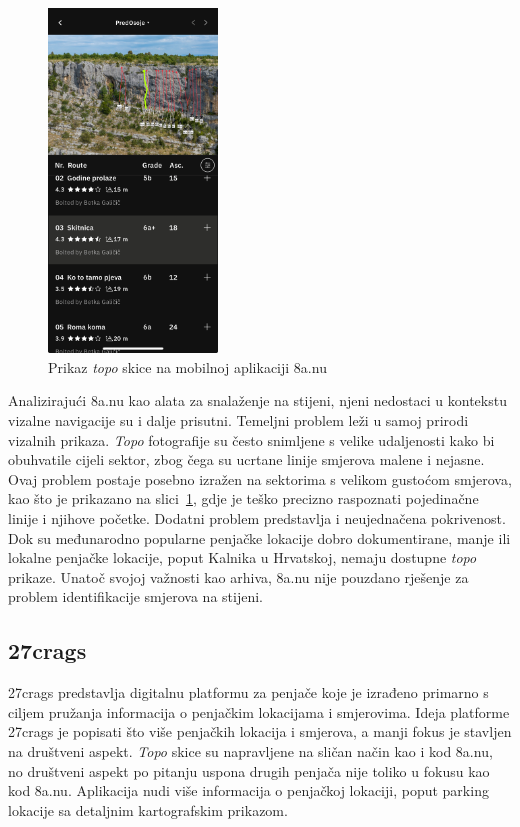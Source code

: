 \begin{figure}[H]
    \centering
    \includegraphics[width=0.4\textwidth]{images/analiza/8anu_mobile.jpg}
    \caption{Prikaz \textit{topo} skice na mobilnoj aplikaciji 8a.nu}
    \label{fig:8anu_mobile}
\end{figure}


Analizirajući 8a.nu kao alata za snalaženje na stijeni, njeni nedostaci u kontekstu vizalne navigacije su i dalje prisutni. Temeljni problem leži u samoj prirodi vizalnih prikaza. \textit{Topo} fotografije su često snimljene s velike udaljenosti kako bi obuhvatile cijeli sektor, zbog čega su ucrtane linije smjerova malene i nejasne. Ovaj problem postaje posebno izražen na sektorima s velikom gustoćom smjerova, kao što je prikazano na slici~\ref{fig:8anu_mobile}, gdje je teško precizno raspoznati pojedinačne linije i njihove početke. Dodatni problem predstavlja i neujednačena pokrivenost. Dok su međunarodno popularne penjačke lokacije dobro dokumentirane, manje ili lokalne penjačke lokacije, poput Kalnika u Hrvatskoj, nemaju dostupne \textit{topo} prikaze. Unatoč svojoj važnosti kao arhiva, 8a.nu nije pouzdano rješenje za problem identifikacije smjerova na stijeni.

\subsection{27crags}

27crags predstavlja digitalnu platformu za penjače koje je izrađeno primarno s ciljem pružanja informacija o penjačkim lokacijama i smjerovima. Ideja platforme 27crags je popisati što više penjačkih lokacija i smjerova, a manji fokus je stavljen na društveni aspekt. \textit{Topo} skice su napravljene na sličan način kao i kod 8a.nu, no društveni aspekt po pitanju uspona drugih penjača nije toliko u fokusu kao kod 8a.nu. Aplikacija nudi više informacija o penjačkoj lokaciji, poput parking lokacije sa detaljnim kartografskim prikazom.

